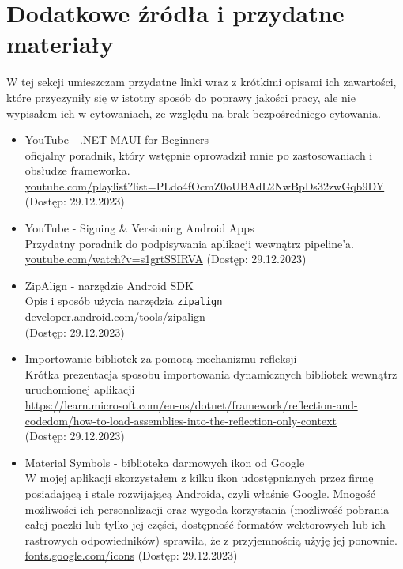 \section{Dodatkowe źródła i przydatne materiały} \label{dodatkoweZrodla}
W tej sekcji umieszczam przydatne linki wraz z krótkimi opisami ich zawartości,
które przyczyniły się w istotny sposób do poprawy jakości pracy, ale nie wypisałem ich w cytowaniach,
ze względu na brak bezpośredniego cytowania.

\begin{itemize}
    \item YouTube - .NET MAUI for Beginners \\
        oficjalny poradnik, który wstępnie oprowadził mnie po zastosowaniach i ob\-słu\-dze frameworka. \\
        \href{youtube.com/playlist?list=PLdo4fOcmZ0oUBAdL2NwBpDs32zwGqb9DY}%
        {youtube.com/playlist?list=PLdo4fOcmZ0oUBAdL2NwBpDs32zwGqb9DY}\\
        (Dostęp: 29.12.2023)
    \item YouTube - Signing \& Versioning Android Apps\\
        Przydatny poradnik do podpisywania aplikacji wewnątrz pipeline'a.\\
        \href{youtube.com/watch?v=s1grtSSIRVA}{youtube.com/watch?v=s1grtSSIRVA}
        (Dostęp: 29.12.2023)
    \item ZipAlign - narzędzie Android SDK\\
        Opis i sposób użycia narzędzia \verb|zipalign| \\
        \href{developer.android.com/tools/zipalign}{developer.android.com/tools/zipalign}\\
        (Dostęp: 29.12.2023)
    \item Importowanie bibliotek za pomocą mechanizmu refleksji\\
        Krótka prezentacja sposobu importowania dynamicznych bibliotek wewnątrz uruchomionej aplikacji \\
        \href{learn.microsoft.com/en-us/dotnet/framework/reflection-and-codedom/how-to-load-assemblies-into-the-reflection-only-context}%
        {https://learn.microsoft.com/en-us/dotnet/framework/reflection-and-codedom/how-to-load-assemblies-into-the-reflection-only-context}\\
        (Dostęp: 29.12.2023)
    \item Material Symbols - biblioteka darmowych ikon od Google\\
        W mojej aplikacji skorzystałem z kilku ikon udostępnianych przez firmę posiadającą i stale 
        rozwijającą Androida, czyli właśnie Google. Mnogość możliwości ich personalizacji 
        oraz wygoda korzystania (możliwość pobrania całej paczki lub tylko jej części, 
        dostępność formatów wektorowych lub ich rastrowych odpowiedników) sprawiła, 
        że z przyjemnością użyję jej ponownie.
        \href{fonts.google.com/icons}{fonts.google.com/icons}
        (Dostęp: 29.12.2023)
\end{itemize}
